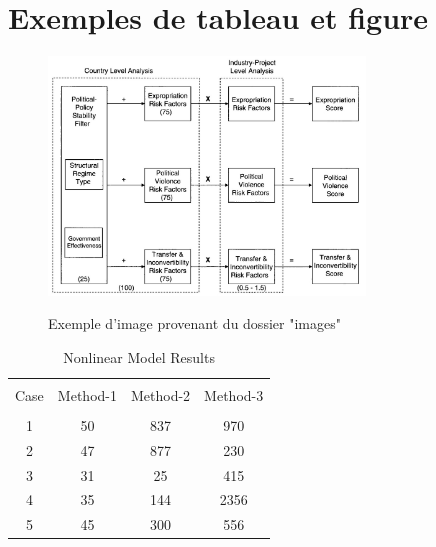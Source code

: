 \newpage
\section{Exemples de tableau et figure}



\begin{figure}[H]
    \centering
    \caption{Exemple d'image provenant du dossier "images"}
    \includegraphics[keepaspectratio, width = 0.75\textwidth]{images/Schema-General.jpg}
    \label{figure1} %
\end{figure}




\begin{table}[ht]
    \centering %
    \caption{Nonlinear Model Results}\label{tableau1} %
    \begin{tabular}{c c c c} %
        \hline\hline \\ [-6.5ex] %
        Case & Method-1 & Method-2 & Method-3 \\ [0.5ex] %
        \hline \\ [-4.5ex] %
        1 & 50 & 837 & 970 \\ %
        2 & 47 & 877 & 230 \\ %
        3 & 31 & 25 & 415 \\
        4 & 35 & 144 & 2356 \\
        5 & 45 & 300 & 556 \\ [1ex] %
        \hline %
    \end{tabular}
    
\end{table}